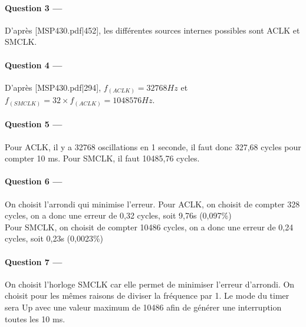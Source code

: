 \documentclass[a4paper,11pt,article]{memoir}
\begin{document}
\paragraph{Question 3 ---}  D'après [MSP430.pdf|452], les différentes sources internes possibles sont ACLK et SMCLK.

\paragraph{Question 4 ---}  D'après [MSP430.pdf|294], $f_(ACLK) = 32768 Hz$ et $f_(SMCLK) = 32 \times f_(ACLK) = 1048576 Hz$.

\paragraph{Question 5 ---}  Pour ACLK, il y a 32768 oscillations en 1 seconde, il faut donc 327,68 cycles pour compter 10 ms. Pour SMCLK, il faut 10485,76 cycles.

\paragraph{Question 6 ---}  On choisit l'arrondi qui minimise l'erreur. Pour ACLK, on choisit de compter 328 cycles, on a donc une erreur de 0,32 cycles, soit 9,76\textmugreek s (0,097\%)\\
Pour SMCLK, on choisit de compter 10486 cycles, on a donc une erreur de 0,24 cycles, soit 0,23\textmugreek s (0,0023\%)

\paragraph{Question 7 ---}  On choisit l'horloge SMCLK car elle permet de minimiser l'erreur d'arrondi. On choisit pour les mêmes raisons de diviser la fréquence par 1. Le mode du timer sera Up avec une valeur maximum de 10486 afin de générer une interruption toutes les 10 ms.
\end{document}
